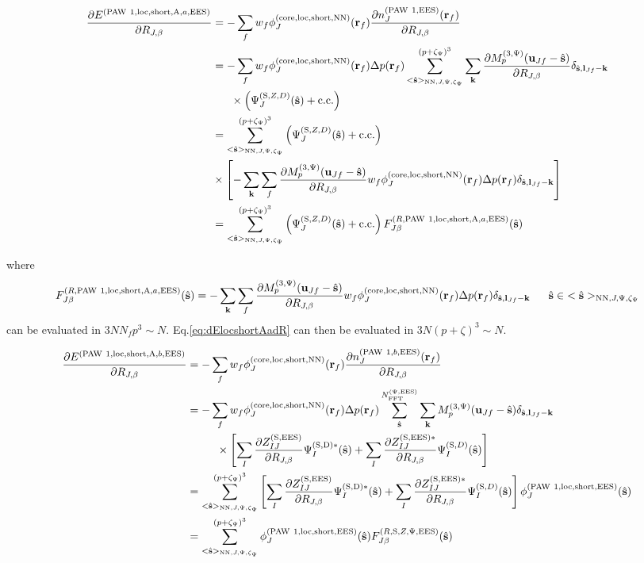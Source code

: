 \documentclass[paper=a4, fontsize=11pt]{article} %
\numberwithin{equation}{section} %
\numberwithin{figure}{section} %
\numberwithin{table}{section} %
\newcommand{\p}{\partial}
\newcommand{\bu}{{\bf{u}}}
\newcommand{\bl}{{\bf{l}}}
\newcommand{\bk}{{\bf{k}}}
\newcommand{\bs}{{\bf{s}}}
\newcommand{\br}{{\bf{r}}}
\newcommand{\hs}{{\hat{\bf{s}}}}
\newcommand{\rS}{{\mathrm{S}}}
\newcommand{\rEES}{{\mathrm{EES}}}
\newcommand{\rcore}{{\mathrm{core}}}
\newcommand{\rNN}{{\mathrm{NN}}}
\newcommand{\rshort}{{\mathrm{short}}}
\newcommand{\rcc}{{\mathrm{c.c.}}}
\newcommand{\rP}{{\mathrm{PAW}}}
\newcommand{\rA}{{\mathrm{A}}}
\newcommand{\rD}{{\mathrm{D}}}
\newcommand{\rlo}{{\mathrm{loc}}}
\newcommand{\RJb}{{R_{J,\beta}}}
\newcommand{\NFFTpEES}{{N^{\mathrm{(\Psi,\rEES})}_{\mathrm{FFT}}}}
\newcommand{\Mp}{{M_p^{(3,\Psi)}}}
\newcommand{\pzp}{{(p+\zeta_{\Psi})^3}}
\newcommand{\hsJp}{{<\hs>_{\rNN,J,\Psi,\zeta_\Psi}}}
\newcommand{\hsinJp}{{\ \ \ \ \ \hs  \in  \hsJp}}
\begin{document}
\begin{equation}\label{eq:dElocshortAadR}
\begin{split}
\frac{\p E^{(\rP\ 1,\rlo,\rshort,\rA,a,\rEES)}}{\p \RJb}
&= - \sum_f w_f \phi_J^{(\rcore,\rlo,\rshort,\rNN)}(\br_f)\frac{\p n_{J}^{(\rP\ 1,\rEES)}(\br_f)}{\p \RJb} \\
&= - \sum_f w_f \phi_J^{(\rcore,\rlo,\rshort,\rNN)}(\br_f)\Delta p(\br_f)\sum_{\hsJp}^{\pzp} \sum_{\bk} \frac{\p \Mp(\bu_{Jf}-\hat \bs)}{\p \RJb}\delta_{\hat \bs,\bl_{Jf}-\bk}\\
&\ \ \ \ \ \times \left(\Psi_J^{(\rS,Z,D)}(\hs)+ \rcc\right)\\
&= \sum_{\hsJp}^{\pzp} \left(\Psi_J^{(\rS,Z,D)}(\hs)+ \rcc\right) \\
&\times \left[-\sum_{\bk}\sum_f  \frac{\p \Mp(\bu_{Jf}-\hat \bs)}{\p \RJb}w_f \phi_J^{(\rcore,\rlo,\rshort,\rNN)}(\br_f)\Delta p(\br_f)\delta_{\hat \bs,\bl_{Jf}-\bk} \right] \\
&= \sum_{\hsJp}^{\pzp} \left(\Psi_J^{(\rS,Z,D)}(\hs)+ \rcc\right) F_{J\beta}^{(R,\rP\ 1,\rlo,\rshort,\rA,a,\rEES)}(\hs)\\
\end{split}
\end{equation}

where
\begin{equation} \label{eq:FJbR1a}
F_{J\beta}^{(R,\rP\ 1,\rlo,\rshort,\rA,a,\rEES)}(\hs)
=-\sum_{\bk}\sum_f  \frac{\p \Mp(\bu_{Jf}-\hat \bs)}{\p \RJb}w_f \phi_J^{(\rcore,\rlo,\rshort,\rNN)}(\br_f)\Delta p(\br_f)\delta_{\hat \bs,\bl_{Jf}-\bk} \hsinJp
\end{equation}
can be evaluated in $ 3NN_fp^3 \sim N$. Eq.\eqref{eq:dElocshortAadR} can then be evaluated in $ 3N(p+\zeta)^3 \sim N$.

\begin{equation}\label{eq:dElocshortAbdR}
\begin{split}
\frac{\p E^{(\rP\ 1,\rlo,\rshort,\rA,b,\rEES)}}{\p \RJb}
&= - \sum_f w_f \phi_J^{(\rcore,\rlo,\rshort,\rNN)}(\br_f)\frac{\p n_{J}^{(\rP\ 1,b,\rEES)}(\br_f)}{\p \RJb} \\
&= - \sum_f w_f \phi_J^{(\rcore,\rlo,\rshort,\rNN)}(\br_f)\Delta p(\br_f)\sum_{\hat \bs}^{\NFFTpEES} \sum_{\bk} \Mp(\bu_{Jf}-\hat \bs)\delta_{\hat \bs,\bl_{Jf}-\bk} \\
&\ \ \ \ \ \ \ \ \times \left[\sum_I \frac{\p Z_{IJ}^{(\rS,\rEES)}}{\p \RJb}\Psi_I^{(\rS,\rD)*}(\hat \bs)+ \sum_I \frac{\p Z_{IJ}^{(\rS,\rEES)*}}{\p \RJb} \Psi_I^{(\rS,D)}(\hs)\right] \\
&= \sum_{\hsJp}^{\pzp} \left[\sum_I \frac{\p Z_{IJ}^{(\rS,\rEES)}}{\p \RJb}\Psi_I^{(\rS,\rD)*}(\hat \bs)+ \sum_I \frac{\p Z_{IJ}^{(\rS,\rEES)*}}{\p \RJb} \Psi_I^{(\rS,D)}(\hs)\right]\phi_J^{(\rP\ 1,\rlo,\rshort,\rEES)}(\hs)\\
&= \sum_{\hsJp}^{\pzp}\phi_J^{(\rP\ 1,\rlo,\rshort,\rEES)}(\hs) F_{J\beta}^{(R,\rS,Z,\Psi,\rEES)}(\hs)
\end{split}
\end{equation}
\end{document}
